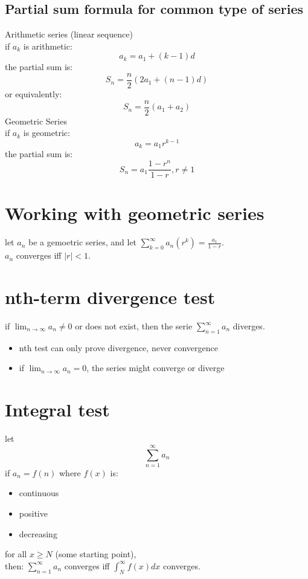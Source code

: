 \documentclass{article}
\begin{document}
                         \subsection{Partial sum formula for common type of series}
                            Arithmetic series (linear sequence)\\ 
                            if \(a_k\) is arithmetic: 
                                \[a_k = a_1 + (k - 1)d\]
                            the partial sum is: 
                                \[S_n = \frac{n}{2}(2a_1 + (n - 1)d)\]
                            or equivalently: 
                                \[S_n = \frac{n}{2}(a_1 + a_2)\]
                            Geometric Series \\ 
                            if \(a_k\) is geometric: 
                                \[a_k = a_1r^{k-1}\]
                            the partial sum is: 
                                \[S_n = a_1 \frac{1 - r^n}{ 1 - r} , r \neq 1\]
                    \section{Working with geometric series}
                            let \(a_n\) be a gemoetric series, and let \(\sum_{k = 0}^{\infty} a_n(r^k) = \frac{a_1}{ 1 - r}\). \\ 
                            \(a_n\) converges iff \(|r| < 1\).
                    \section{nth-term divergence test}
                          if \(\lim_{n \to \infty} a_n \neq 0\) or does not exist, then the serie \(\sum_{n = 1}^{\infty} a_n\) diverges. 
                          \begin{itemize}
                            \item nth test can only prove divergence, never convergence
                            \item if \(\lim_{n \to \infty} a_n = 0\), the series might converge or diverge
                          \end{itemize} 
                    \section{Integral test}
                          let 
                                \[\sum_{n = 1}^{\infty} a_n\]
                          if \(a_n = f(n)\) where \(f(x)\) is: 
                          \begin{itemize}
                            \item continuous
                            \item positive
                            \item decreasing
                          \end{itemize}
                          for all  \(x \geq N\) (some starting point),\\ 
                          then: 
                          \(\sum_{n=1}^{\infty} a_n\) converges iff \(\int_{N}^{\infty} f(x)dx\) converges.
\end{document}
